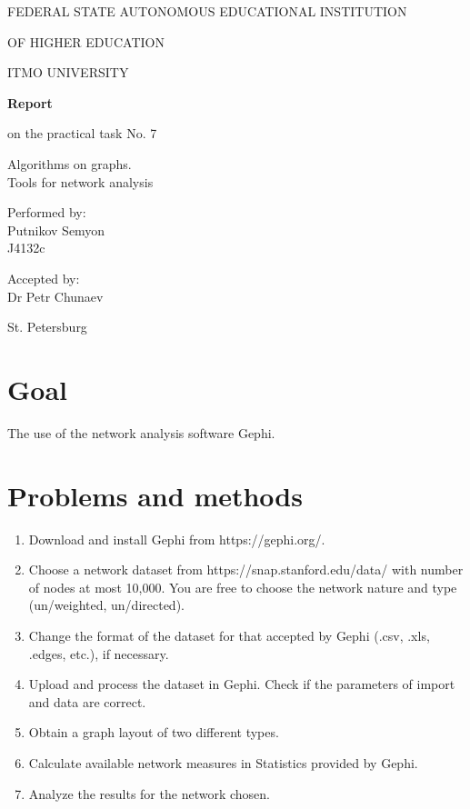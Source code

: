 \documentclass[a4paper,article,14pt]{extarticle}
\begin{document}
	\begin{titlepage}
		\begin{center}
			FEDERAL STATE AUTONOMOUS EDUCATIONAL INSTITUTION
			
			OF HIGHER EDUCATION
			
			ITMO UNIVERSITY
			\vspace{3cm}
			
			\large\textbf{Report}
			
			\large on the practical task No. 7
			
			\large \flqq Algorithms on graphs. \\ Tools for network analysis\frqq
			\vspace{5cm}
			

			\begin{flushright}
				{Performed by:} \\
				Putnikov Semyon \\ 
				J4132c \\
			\end{flushright}
			
			
			\begin{flushright}
				{Accepted by:} \\
				Dr Petr Chunaev \\ 
			\end{flushright}
			\vfill
			
			{St. Petersburg}
			\par{\number\year}
		\end{center}
	\end{titlepage}

	\newpage
	
	\section{Goal}
	The use of the network analysis software Gephi.
	
	\section{Problems and methods}
	\begin{enumerate}
		\item Download and install Gephi from https://gephi.org/.
		\item Choose a network dataset from https://snap.stanford.edu/data/ with number of nodes at most 10,000. You are free to choose the network nature and type (un/weighted, un/directed).
		\item Change the format of the dataset for that accepted by Gephi (.csv, .xls, .edges, etc.), if necessary.
		\item Upload and process the dataset in Gephi. Check if the parameters of import and data are correct.
		\item Obtain a graph layout of two different types.
		\item Calculate available network measures in Statistics provided by Gephi.
		\item Analyze the results for the network chosen.
	\end{enumerate}
\end{document}
